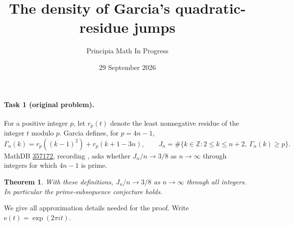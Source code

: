 \documentclass[11pt]{article}
\title{The density of Garcia's quadratic-residue jumps}
\author{Principia Math In Progress}
\date{29 September 2026}
\newtheorem{theorem}{Theorem}
\newcommand{\e}{\mathrm e}
\begin{document}
\maketitle

\paragraph{Task 1 (original problem).}
For a positive integer \(p\), let \(r_p(t)\) denote the least
nonnegative residue of the integer \(t\) modulo \(p\).
Garcia \cite[pp.~5, 22]{Garcia} defines, for \(p=4n-1\),
\[
 \Gamma_n(k)=r_p((k-1)^2)+r_p(k+1-3n),\qquad
 J_n=\#\{k\in\mathbb Z:2\le k\le n+2,\ \Gamma_n(k)\ge p\}.
\]
MathDB \href{https://mathdb.com/p/357172}{357172}, recording
\cite[Conjecture 6.5, p.~29]{Garcia}, asks whether
\(J_n/n\to3/8\) as \(n\to\infty\) through integers for which \(4n-1\)
is prime.

\begin{theorem}
With these definitions, \(J_n/n\to3/8\) as \(n\to\infty\) through
\emph{all} integers. In particular the prime-subsequence conjecture holds.
\end{theorem}

We give all approximation details needed for the proof.
Write \(\e(t)=\exp(2\pi i t)\).
\end{document}
